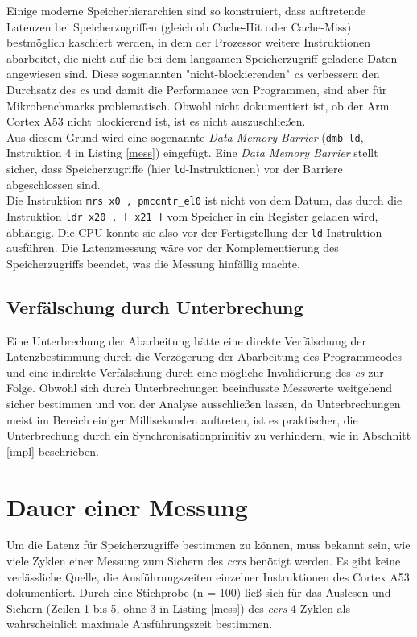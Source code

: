 \documentclass[]{scrbook}
\begin{document}
Einige moderne Speicherhierarchien sind so konstruiert, dass auftretende Latenzen bei Speicherzugriffen (gleich ob Cache-Hit oder Cache-Miss) bestmöglich kaschiert werden, in dem der Prozessor weitere Instruktionen abarbeitet, die nicht auf die bei dem langsamen Speicherzugriff geladene Daten angewiesen sind.
Diese sogenannten "nicht-blockieren\-den" \textsl{\glspl{c}} verbessern den Durchsatz des \textsl{\gls{c}s} und damit die Performance von Programmen, sind aber für Mikrobenchmarks problematisch.
Obwohl nicht dokumentiert ist, ob der Arm Cortex A53 nicht blockierend ist, ist es nicht auszuschließen.
\\
Aus diesem Grund wird eine sogenannte \textsl{Data Memory Barrier} (\texttt{dmb ld}, Instruktion 4 in Listing \ref{mess}) eingefügt.
Eine \textsl{Data Memory Barrier} stellt sicher, dass Speicherzugriffe (hier \texttt{ld}-Instruktionen) vor der Barriere abgeschlossen sind. \cite[S.\,15 f.]{armArch}
\\
Die Instruktion \texttt{mrs x0 , pmccntr\_el0} ist nicht von dem Datum, das durch die Instruktion \texttt{ldr x20 , [ x21 ]} vom Speicher in ein Register geladen wird, abhängig.
Die CPU könnte sie also vor der Fertigstellung der \texttt{ld}-Instruktion ausführen.
Die Latenzmessung wäre vor der Komplementierung des Speicherzugriffs beendet, was die Messung hinfällig machte.

\subsection{Verfälschung durch Unterbrechung} \label{fail}

Eine Unterbrechung der Abarbeitung hätte eine direkte Verfälschung der Latenzbestimmung durch die Verzögerung der Abarbeitung des Programmcodes und eine indirekte Verfälschung durch eine mögliche Invalidierung des \textsl{\gls{c}s} zur Folge.
Obwohl sich durch Unterbrechungen beeinflusste Messwerte weitgehend sicher bestimmen und von der Analyse ausschließen lassen, da Unterbrechungen meist im Bereich einiger Millisekunden auftreten, ist es praktischer, die Unterbrechung durch ein Synchronisationprimitiv  zu verhindern, wie in Abschnitt \ref{impl} beschrieben.

\section{Dauer einer Messung} \label{emptyM}

Um die Latenz für Speicherzugriffe bestimmen zu können, muss bekannt sein, wie viele Zyklen einer Messung zum Sichern des \textsl{\gls{ccr}s} benötigt werden.
Es gibt keine verlässliche Quelle, die Ausführungszeiten einzelner Instruktionen des Cortex A53 dokumentiert.
Durch eine Stichprobe (n = 100) ließ sich für das Auslesen und Sichern (Zeilen 1 bis 5, ohne 3 in Listing \ref{mess}) des \textsl{\gls{ccr}s} 4 Zyklen als wahrscheinlich maximale Ausführungszeit bestimmen.
\end{document}
